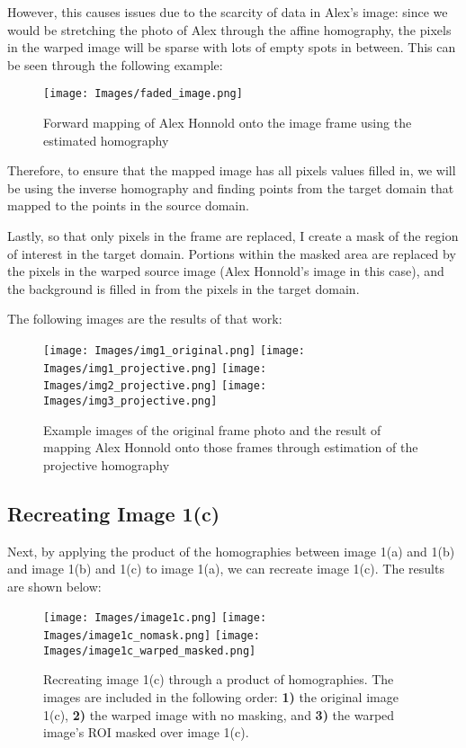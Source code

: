 \documentclass{article}
\begin{document}
However, this causes issues due to the scarcity of data in Alex's image: since we would be stretching the photo of Alex through the affine homography, the pixels in the warped image will be sparse with lots of empty spots in between. This can be seen through the following example:

\begin{figure}[H]
    \centering
    \texttt{[image: Images/faded\_image.png]}
    \caption{Forward mapping of Alex Honnold onto the image frame using the estimated homography}
    \label{fig:enter-label}
\end{figure}

Therefore, to ensure that the mapped image has all pixels values filled in, we will be using the inverse homography and finding points from the target domain that mapped to the points in the source domain.  

Lastly, so that only pixels in the frame are replaced, I create a mask of the region of interest in the target domain. Portions within the masked area are replaced by the pixels in the warped source image (Alex Honnold's image in this case), and the background is filled in from the pixels in the target domain.

The following images are the results of that work:

\begin{figure}[H]
    \centering
    \texttt{[image: Images/img1\_original.png]}
    \texttt{[image: Images/img1\_projective.png]}
    \texttt{[image: Images/img2\_projective.png]}
    \texttt{[image: Images/img3\_projective.png]}
    \caption{Example images of the original frame photo and the result of mapping Alex Honnold onto those frames through estimation of the projective homography}
    \label{fig:enter-label}
\end{figure}


\subsection{Recreating Image 1(c)}
Next, by applying the product of the homographies between image 1(a) and 1(b) and image 1(b) and 1(c) to image 1(a), we can recreate image 1(c). The results are shown below:


\begin{figure}[H]
    \centering
    \texttt{[image: Images/image1c.png]}
    \texttt{[image: Images/image1c\_nomask.png]}
    \texttt{[image: Images/image1c\_warped\_masked.png]}
    \caption{Recreating image 1(c) through a product of homographies. The images are included in the following order: \textbf{1)} the original image 1(c), \textbf{2)} the warped image with no masking, and \textbf{3)} the warped image's ROI masked over image 1(c).}
    \label{fig:enter-label}
\end{figure}
\end{document}
